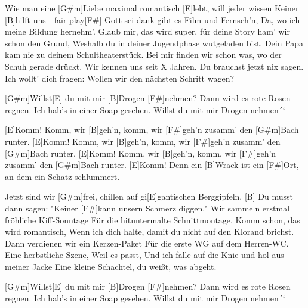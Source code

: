 



\begin{guitar}
	
	Wie man eine [G#m]Liebe maximal romantisch [E]lebt, will jeder wissen
	Keiner [B]hilft uns - fair play[F#]{ }
	Gott sei dank gibt es Film und Fernseh'n,
	Da, wo ich meine Bildung hernehm'.
	Glaub mir, das wird super, für deine Story ham' wir schon den Grund,
	Weshalb du in deiner Jugendphase wutgeladen bist.
	Dein Papa kam nie zu deinem Schultheaterstück.
	Bei mir finden wir schon was, wo der Schuh gerade drückt.
	Wir kennen uns seit X Jahren.
	Du brauchst jetzt nix sagen.
	Ich wollt' dich fragen:
	Wollen wir den nächsten Schritt wagen?
	
	\begin{slimhighlightbar}
		[G#m]Willst[E] du mit mir [B]Drogen [F#]nehmen?
		Dann wird es rote Rosen regnen.
		Ich hab’s in einer Soap gesehen.
		Willst du mit mir Drogen nehmen´`
	\end{slimhighlightbar}
	
	\begin{highlightbar}
		\songsection{Refrain}
		[E]Komm! Komm, wir [B]geh'n, komm, wir [F#]geh'n zusamm' den [G#m]Bach runter.
		[E]Komm! Komm, wir [B]geh'n, komm, wir [F#]geh'n zusamm' den [G#m]Bach runter.
		[E]Komm! Komm, wir [B]geh'n, komm, wir [F#]geh'n zusamm' den [G#m]Bach runter.
		[E]Komm! Denn ein [B]Wrack ist ein [F#]Ort, an dem ein Schatz schlummert.
	\end{highlightbar}
	
	\pagebreak
	\songsection{Strophe 2}
	Jetzt sind wir [G#m]frei, chillen auf gi[E]gantischen Berggipfeln.
	[B] Du musst dann sagen: "Keiner [F#]kann unsern Schmerz diggen."
	Wir sammeln erstmal fröhliche Kiff-Sonntage
	Für die hituntermalte Schnittmontage.
	Komm schon, das wird romantisch,
	Wenn ich dich halte, damit du nicht auf den Klorand brichst.
	Dann verdienen wir ein Kerzen-Paket
	Für die erste WG auf dem Herren-WC.
	Eine herbstliche Szene,
	Weil es passt,
	Und ich falle auf die Knie und hol aus meiner Jacke
	Eine kleine Schachtel, du weißt, was abgeht.
	
	\begin{slimhighlightbar}
		\songsection{Bridge}
		[G#m]Willst[E] du mit mir [B]Drogen [F#]nehmen?
		Dann wird es rote Rosen regnen.
		Ich hab’s in einer Soap gesehen.
		Willst du mit mir Drogen nehmen´`
	\end{slimhighlightbar}
	

\end{guitar}
